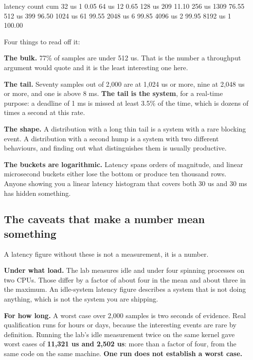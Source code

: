 \begin{console}
latency         count    cum %
       32 us        1    0.05%
       64 us       12    0.65%
      128 us      209   11.10%
      256 us     1309   76.55%
      512 us      399   96.50%
     1024 us       61   99.55%
     2048 us        6   99.85%
     4096 us        2   99.95%
     8192 us        1  100.00%
\end{console}

\noindent Four things to read off it:

\textbf{The bulk.} 77\% of samples are under 512 us. That is the number a throughput argument would
quote and it is the least interesting one here.

\textbf{The tail.} Seventy samples out of 2,000 are at 1,024 us or more, nine at 2,048 us or more,
and one is above 8 ms. \textbf{The tail is the system}, for a real-time purpose: a deadline of 1 ms
is missed at least 3.5\% of the time, which is dozens of times a second at this rate.

\textbf{The shape.} A distribution with a long thin tail is a system with a rare blocking event. A
distribution with a second hump is a system with two different behaviours, and finding out what
distinguishes them is usually productive.

\textbf{The buckets are logarithmic.} Latency spans orders of magnitude, and linear microsecond
buckets either lose the bottom or produce ten thousand rows. Anyone showing you a linear latency
histogram that covers both 30 us and 30 ms has hidden something.

\subsection{The caveats that make a number mean something}
\label{c12:app:b5}

A latency figure without these is not a measurement, it is a number.

\textbf{Under what load.} The lab measures idle and under four spinning processes on two CPUs. Those
differ by a factor of about four in the mean and about three in the maximum. An idle-system latency
figure describes a system that is not doing anything, which is not the system you are shipping.

\textbf{For how long.} A worst case over 2,000 samples is two seconds of evidence. Real
qualification runs for hours or days, because the interesting events are rare by definition. Running
the lab's idle measurement twice on the same kernel gave worst cases of \textbf{11,321 us and 2,502
us}: more than a factor of four, from the same code on the same machine. \textbf{One run does not
establish a worst case.}

